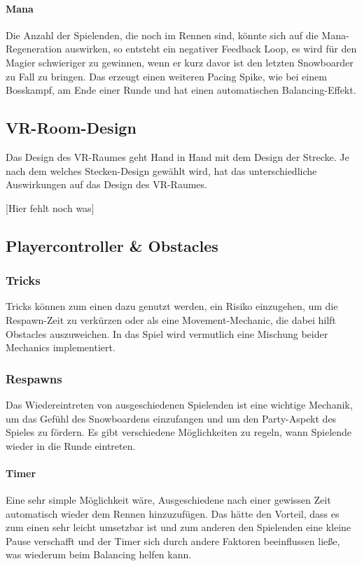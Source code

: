 \paragraph{Mana}
Die Anzahl der Spielenden, die noch im Rennen sind, könnte sich auf die Mana-Regeneration auswirken, so entsteht ein negativer Feedback Loop, es wird für den Magier schwieriger zu gewinnen, wenn er kurz davor ist den letzten Snowboarder zu Fall zu bringen. Das erzeugt einen weiteren Pacing Spike, wie bei einem Bosskampf, am Ende einer Runde und hat einen automatischen Balancing\cite[S. 296]{_game_design_workshop}-Effekt.

\subsection{VR-Room-Design}

Das Design des VR-Raumes geht Hand in Hand mit dem Design der Strecke. Je nach dem welches Stecken-Design gewählt wird, hat das unterschiedliche Auswirkungen auf das Design des VR-Raumes.

[Hier fehlt noch was]

\subsection{Playercontroller \& Obstacles\label{_playercontroller}}
\subsubsection{Tricks}
Tricks können zum einen dazu genutzt werden, ein Risiko einzugehen, um die Respawn-Zeit zu verkürzen oder als eine Movement-Mechanic, die dabei hilft Obstacles auszuweichen. In das Spiel wird vermutlich eine Mischung beider Mechanics implementiert.

\subsubsection{Respawns}
Das Wiedereintreten von ausgeschiedenen Spielenden ist eine wichtige Mechanik, um das Gefühl des Snowboardens einzufangen und um den Party-Aspekt des Spieles zu fördern. Es gibt verschiedene Möglichkeiten zu regeln, wann Spielende wieder in die Runde eintreten.

\paragraph{Timer}
Eine sehr simple Möglichkeit wäre, Ausgeschiedene nach einer gewissen Zeit automatisch wieder dem Rennen hinzuzufügen. Das hätte den Vorteil, dass es zum einen sehr leicht umsetzbar ist und zum anderen den Spielenden eine kleine Pause verschafft und der Timer sich durch andere Faktoren beeinflussen ließe, was wiederum beim Balancing helfen kann.

